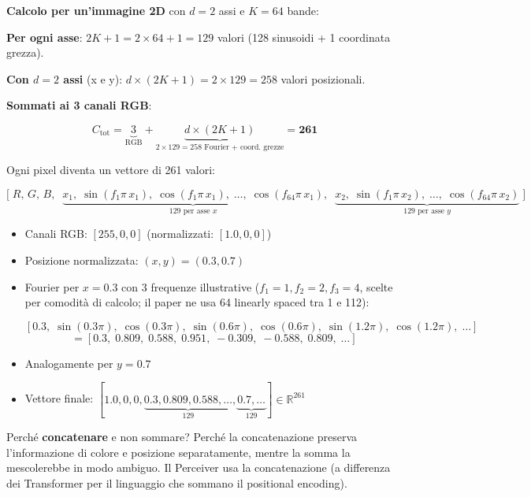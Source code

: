 \documentclass[
  11pt,
]{article}
\begin{document}
\begin{formulabox}[title={\textbf{Calcolo di $C$: perché 261 e non 3}}]
\medskip
\textbf{Calcolo per un'immagine 2D} con $d=2$ assi e $K=64$ bande:

\textbf{Per ogni asse}: $2K + 1 = 2 \times 64 + 1 = 129$ valori (128 sinusoidi + 1 coordinata grezza).

\textbf{Con $d=2$ assi} (x e y): $d \times (2K+1) = 2 \times 129 = 258$ valori posizionali.

\textbf{Sommati ai 3 canali RGB}:

\[
C_{\text{tot}} = \underbrace{3}_{\text{RGB}} + \underbrace{d \times (2K + 1)}_{2 \times 129 = 258 \text{ Fourier + coord. grezze}} = \mathbf{261}
\]

Ogni pixel diventa un vettore di 261 valori:

\[
\Big[\; R,\, G,\, B,\;\; \underbrace{x_1,\; \sin(f_1 \pi\, x_1),\; \cos(f_1 \pi\, x_1),\; \ldots,\; \cos(f_{64} \pi\, x_1)}_{129 \text{ per asse } x},\;\; \underbrace{x_2,\; \sin(f_1 \pi\, x_2),\; \ldots,\; \cos(f_{64} \pi\, x_2)}_{129 \text{ per asse } y} \;\Big]
\]
\end{formulabox}

\begin{notabox}[title={\textbf{Esempio concreto: un pixel in posizione $(0.3, 0.7)$ con colore rosso}}]
\begin{itemize}
\item Canali RGB: $[255, 0, 0]$ (normalizzati: $[1.0, 0, 0]$)
\item Posizione normalizzata: $(x, y) = (0.3, 0.7)$
\item Fourier per $x=0.3$ con 3 frequenze illustrative ($f_1=1, f_2=2, f_3=4$, scelte per comodità di calcolo; il paper ne usa 64 linearly spaced tra 1 e 112):

\[
[0.3,\; \sin(0.3\pi),\; \cos(0.3\pi),\; \sin(0.6\pi),\; \cos(0.6\pi),\; \sin(1.2\pi),\; \cos(1.2\pi),\; \ldots]
\]
\[
= [0.3,\; 0.809,\; 0.588,\; 0.951,\; -0.309,\; -0.588,\; 0.809,\; \ldots]
\]
\item Analogamente per $y=0.7$
\item Vettore finale: $[1.0, 0, 0, \underbrace{0.3, 0.809, 0.588, \ldots}_{129}, \underbrace{0.7, \ldots}_{129}] \in \mathbb{R}^{261}$
\end{itemize}
Perché \textbf{concatenare} e non sommare? Perché la concatenazione preserva l'informazione di colore e posizione separatamente, mentre la somma la mescolerebbe in modo ambiguo. Il Perceiver usa la concatenazione (a differenza dei Transformer per il linguaggio che sommano il positional encoding).
\end{notabox}
\end{document}
